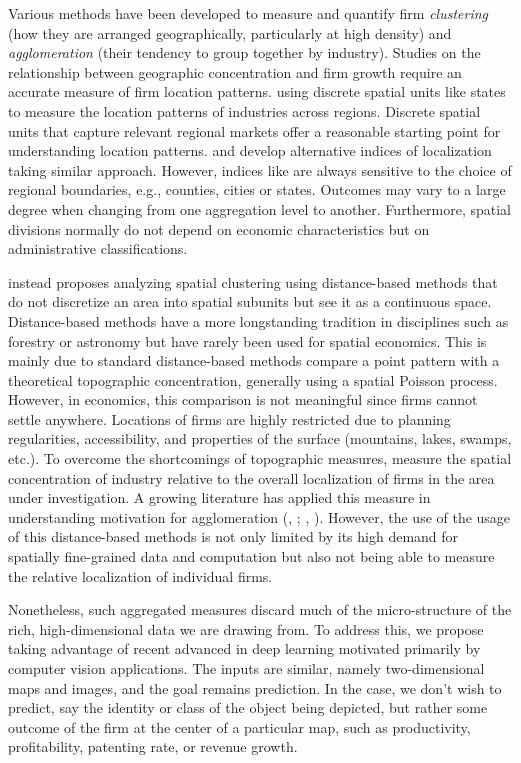 \documentclass[12pt]{article}
\begin{document}
Various methods have been developed to measure and quantify firm \textit{clustering} (how they are arranged geographically, particularly at high density) and \textit{agglomeration} (their tendency to group together by industry). Studies on the relationship between geographic concentration and firm growth require an accurate measure of firm location patterns.  \cite{ellison1997geographic} using discrete spatial units like states to measure the location patterns of industries across regions. Discrete spatial units that capture relevant regional markets offer a reasonable starting point for understanding location patterns. \cite{maurel1999measure} and \cite{devereux2004geographic} develop alternative indices of localization taking similar approach. However, indices like \cite{ellison1997geographic} are always sensitive to the choice of regional boundaries, e.g., counties, cities or states. Outcomes may vary to a large degree when changing from one aggregation level to another. Furthermore, spatial divisions normally do not depend on economic characteristics but on administrative classifications.

\cite{duranton2005testing} instead proposes analyzing spatial clustering using distance-based methods that do not discretize an area into spatial subunits but see it as a continuous space. Distance-based methods have a more longstanding tradition in disciplines such as forestry or astronomy but have rarely been used for spatial economics. This is mainly due to standard distance-based methods compare a point pattern with a theoretical topographic concentration, generally using a spatial Poisson process. However, in economics, this comparison is not meaningful since firms cannot settle anywhere. Locations of firms are highly restricted due to planning regularities, accessibility, and properties of the surface (mountains, lakes, swamps, etc.). To overcome the shortcomings of topographic measures, \cite{duranton2005testing} measure the spatial concentration of industry relative to the overall localization of firms in the area under investigation. A growing literature has applied this measure in understanding motivation for agglomeration (\citeauthor{ellison2010causes}, \citeyear{ellison2010causes}; \citeauthor{alfaro2014global}, \citeyear{alfaro2014global}). However, the use of the usage of this distance-based methods is not only limited by its high demand for spatially fine-grained data and computation but also not being able to measure the relative localization of individual firms.

Nonetheless, such aggregated measures discard much of the micro-structure of the rich, high-dimensional data we are drawing from. To address this, we propose taking advantage of recent advanced in deep learning motivated primarily by computer vision applications. The inputs are similar, namely two-dimensional maps and images, and the goal remains prediction. In the case, we don't wish to predict, say the identity or class of the object being depicted, but rather some outcome of the firm at the center of a particular map, such as productivity, profitability, patenting rate, or revenue growth.
\end{document}
